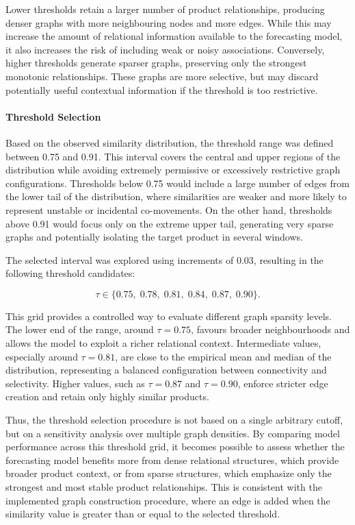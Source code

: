 Lower thresholds retain a larger number of product relationships, producing denser graphs with more neighbouring nodes and more edges. While this may increase the amount of relational information available to the forecasting model, it also increases the risk of including weak or noisy associations. Conversely, higher thresholds generate sparser graphs, preserving only the strongest monotonic relationships. These graphs are more selective, but may discard potentially useful contextual information if the threshold is too restrictive.

\paragraph{Threshold Selection}

Based on the observed similarity distribution, the threshold range was defined between 0.75 and 0.91. This interval covers the central and upper regions of the distribution while avoiding extremely permissive or excessively restrictive graph configurations. Thresholds below 0.75 would include a large number of edges from the lower tail of the distribution, where similarities are weaker and more likely to represent unstable or incidental co-movements. On the other hand, thresholds above 0.91 would focus only on the extreme upper tail, generating very sparse graphs and potentially isolating the target product in several windows.

The selected interval was explored using increments of 0.03, resulting in the following threshold candidates:

\[
\tau \in \{0.75,\; 0.78,\; 0.81,\; 0.84,\; 0.87,\; 0.90\}.
\]

This grid provides a controlled way to evaluate different graph sparsity levels. The lower end of the range, around $\tau = 0.75$, favours broader neighbourhoods and allows the model to exploit a richer relational context. Intermediate values, especially around $\tau = 0.81$, are close to the empirical mean and median of the distribution, representing a balanced configuration between connectivity and selectivity. Higher values, such as $\tau = 0.87$ and $\tau = 0.90$, enforce stricter edge creation and retain only highly similar products.

Thus, the threshold selection procedure is not based on a single arbitrary cutoff, but on a sensitivity analysis over multiple graph densities. By comparing model performance across this threshold grid, it becomes possible to assess whether the forecasting model benefits more from dense relational structures, which provide broader product context, or from sparse structures, which emphasize only the strongest and most stable product relationships. This is consistent with the implemented graph construction procedure, where an edge is added when the similarity value is greater than or equal to the selected threshold. 
